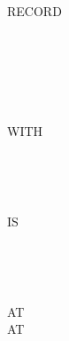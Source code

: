 \begin{syntax}
   \filename
  \begin{0-1}
     \\
  \end{0-1}
  RECORD
  \begin{0-1}
     \identifier
  \end{0-1}

  \begin{0-1}
    \begin{1=}
        \\
    \end{1=} \\

    \begin{0-1}
       \\
    \end{0-1}
    \begin{0-1}
      WITH
      \begin{1=}
        \begin{0-1}
           \\
        \end{0-1}
         \\

      \end{1=}
    \end{0-1}
  \end{0-1}

  \begin{0-1}
     IS \identifier
  \end{0-1}

  \begin{0-1}
    \begin{1+}
        \imperativestatement \\
         \imperativestatement
    \end{1+} \\

    \begin{1+}
      AT  \imperativestatement \\
       AT  \imperativestatement
    \end{1+}
  \end{0-1}

  \begin{0-1}
  \end{0-1}
\end{syntax}

